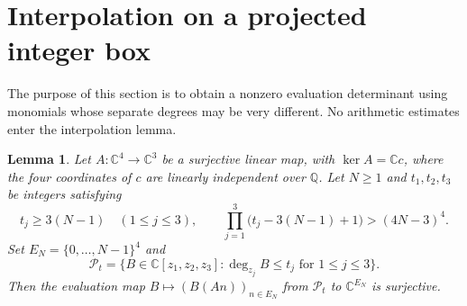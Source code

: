 \documentclass[11pt,a4paper]{amsart}
\newtheorem{lemma}[theorem]{Lemma}
\theoremstyle{remark}
\newcommand{\Q}{\mathbb Q}
\newcommand{\C}{\mathbb C}
\newcommand{\cP}{\mathcal P}
\numberwithin{equation}{section}
\begin{document}
\section{Interpolation on a projected integer box}\label{sec:interpolation}

The purpose of this section is to obtain a nonzero evaluation
determinant using monomials whose separate degrees may be very
different. No arithmetic estimates enter the interpolation lemma.

\begin{lemma}\label{lem:interpolation}
Let $A:\C^4\to\C^3$ be a surjective linear map, with $\ker A=\C c$, where the
four coordinates of $c$ are linearly independent over $\Q$.
Let $N\ge1$ and $t_1,t_2,t_3$ be integers satisfying
\begin{equation}\label{eq:budget}
 t_j\ge3(N-1)\quad(1\le j\le3),\qquad
 \prod_{j=1}^3\bigl(t_j-3(N-1)+1\bigr)>(4N-3)^4.
\end{equation}
Set $E_N=\{0,\ldots,N-1\}^4$ and
\[
 \cP_t=\{B\in\C[z_1,z_2,z_3]:\deg_{z_j}B\le t_j
                                      \text{ for }1\le j\le3\}.
\]
Then the evaluation map $B\mapsto(B(An))_{n\in E_N}$ from
$\cP_t$ to $\C^{E_N}$ is surjective.
\end{lemma}
\end{document}

